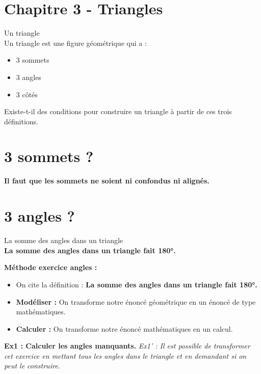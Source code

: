 



\horrule{2px}
\section*{Chapitre 3 - Triangles}
\horrule{2px}

\begin{Definition}{Un triangle}\\
  Un triangle est une figure géométrique qui a : 
  \begin{itemize}
    \item 3 sommets
    \item 3 angles
    \item 3 côtés
  \end{itemize}
\end{Definition}

Existe-t-il des conditions pour construire un triangle à partir de ces trois définitions.

\section*{3 sommets ?}

\textbf{Il faut que les sommets ne soient ni confondus ni alignés.}

\section*{3 angles ?}

\begin{Definition}{La somme des angles dans un triangle}\\
  \textbf{La somme des angles dans un triangle fait 180°.}
\end{Definition}


\textbf{Méthode exercice angles :}

\begin{itemize}
  \item On cite la définition : \textbf{La somme des angles dans un triangle fait 180°.}
  \item \textbf{Modéliser : } On transforme notre énoncé géométrique en un énoncé de type mathématiques.
  \item \textbf{Calculer : } On transforme notre énoncé mathématiques en un calcul. 
\end{itemize}

\horrule{1px}
\textbf{Ex1 : Calculer les angles manquants.}
\textit{Ex1' : Il est possible de transformer cet exercice en mettant tous les angles dans le triangle et en demandant si on peut le construire.}


